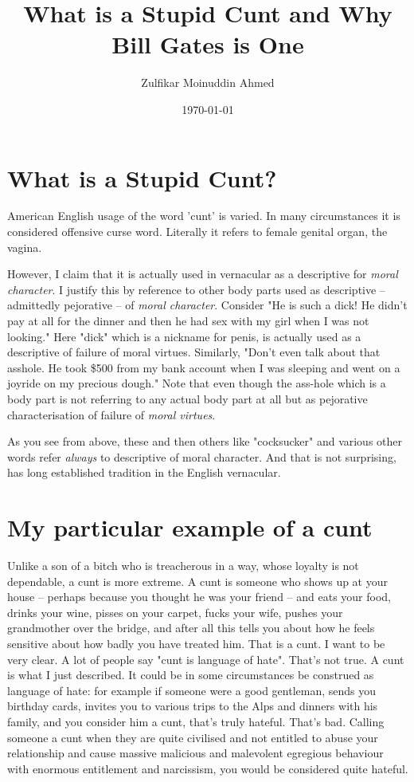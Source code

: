 \documentclass{amsart}
\title{What is a Stupid Cunt and Why Bill Gates is One}
\author{Zulfikar Moinuddin Ahmed}
\date{\today}
\begin{document}
\maketitle

\section{What is a Stupid Cunt?}

American English usage of the word 'cunt' is varied.  In many circumstances it is considered offensive curse word.  Literally it refers to female genital organ, the vagina.  

However, I claim that it is actually used in vernacular as a descriptive for {\em moral character}.  I justify this by reference to other body parts used as descriptive -- admittedly pejorative -- of {\em moral character}.  Consider "He is such a dick!  He didn't pay at all for the dinner and then he had sex with my girl when I was not looking."  Here "dick" which is a nickname for penis, is actually used as a descriptive of failure of moral virtues.  Similarly, "Don't even talk about that asshole.  He took \$500 from my bank account when I was sleeping and went on a joyride on my precious dough."  Note that even though the ass-hole which is a body part is not referring to any actual body part at all but as pejorative characterisation of failure of {\em moral virtues}.  

As you see from above, these and then others like "cocksucker" and various other words refer {\em always} to descriptive of moral character.  And that is not surprising, has long established tradition in the English vernacular.  

\section{My particular example of a cunt}

Unlike a son of a bitch who is treacherous in a way, whose loyalty is not dependable, a cunt is more extreme.  A cunt is someone who shows up at your house -- perhaps because you thought he was your friend -- and eats your food, drinks your wine, pisses on your carpet, fucks your wife, pushes your grandmother over the bridge, and after all this tells you about how he feels sensitive about how badly you have treated him.  That is a cunt. I want to be very clear.  A lot of people say "cunt is language of hate".  That's not true.  A cunt is what I just described. It could be in some circumstances be construed as language of hate: for example if someone were a good gentleman, sends you birthday cards, invites you to various trips to the Alps and dinners with his family, and you consider him a cunt, that's truly hateful.  That's bad.  Calling someone a cunt when they are quite civilised and not entitled to abuse your relationship and cause massive malicious and malevolent egregious behaviour with enormous entitlement and narcissism, you would be considered quite hateful.  
\end{document}
